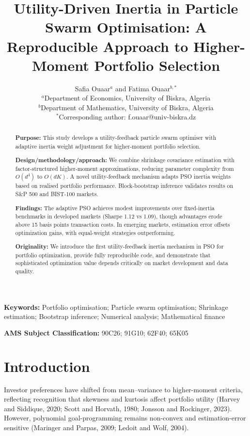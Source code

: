 \documentclass[12pt,a4paper]{article}
\title{Utility-Driven Inertia in Particle Swarm Optimisation: A Reproducible Approach to Higher-Moment Portfolio Selection}
\author{Safia Ouaar$^{a}$ and Fatima Ouaar$^{b,*}$\\
	\small $^{a}$Department of Economics, University of Biskra, Algeria\\
	\small $^{b}$Department of Mathematics, University of Biskra, Algeria\\
	\small $^{*}$Corresponding author: f.ouaar@univ-biskra.dz}
\date{}
\begin{document}
	
	\maketitle
	
	\begin{abstract}
		\noindent\textbf{Purpose:} This study develops a utility-feedback particle swarm optimiser with adaptive inertia weight adjustment for higher-moment portfolio selection.
		
		\noindent\textbf{Design/methodology/approach:} We combine shrinkage covariance estimation with factor-structured higher-moment 
		approximations, reducing parameter complexity from $O(d^4)$ to $O(dK)$. A novel 
		utility-feedback mechanism adapts PSO inertia weights based on realised portfolio 
		performance. Block-bootstrap inference validates results on S\&P 500 and BIST-100 
		markets.
		
		\noindent\textbf{Findings:}
		The adaptive PSO achieves modest improvements over fixed-inertia benchmarks in 
		developed markets (Sharpe 1.12 vs 1.09), though advantages erode above 15 basis 
		points transaction costs. In emerging markets, estimation error offsets optimization 
		gains, with equal-weight strategies outperforming.
		
		\noindent\textbf{Originality:}
		We introduce the first utility-feedback inertia mechanism in PSO for portfolio 
		optimization, provide fully reproducible code, and demonstrate that sophisticated 
		optimization value depends critically on market development and data quality.
	\end{abstract}
	
	\textbf{Keywords:} Portfolio optimisation; Particle swarm optimisation; Shrinkage estimation; Bootstrap inference; Numerical analysis; Mathematical finance
	
	\textbf{AMS Subject Classification:} 90C26; 91G10; 62F40; 65K05
	
	\section{Introduction}
	
	Investor preferences have shifted from mean--variance to higher-moment criteria, reflecting recognition that skewness and kurtosis affect portfolio utility (Harvey and Siddique, 2020; Scott and Horvath, 1980; Jonsson and Rockinger, 2023). However, polynomial goal-programming remains non-convex and estimation-error sensitive (Maringer and Parpas, 2009; Ledoit and Wolf, 2004).
	
\end{document}
